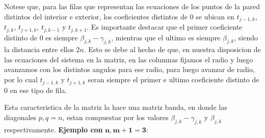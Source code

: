 \medskip
Notese que, para las filas que representan las ecuaciones de los puntos de la pared distintos del interior e exterior, los coeficientes distintos de 0 se ubican en $t_{j-1,k}$, $t_{j,k}$, $t_{j+1,k}$, $t_{j,k-1}$ y $t_{j,k+1}$.
Es importante destacar que el primer coeficiente distinto de 0 es siempre $\beta_{j,k} - \gamma_{j,k}$, mientras que el ultimo es siempre $\beta_{j,k}$, siendo la distancia entre ellos $2n$. Esto se debe al hecho de que, en nuestra disposicion de las ecuaciones del sistema en la matriz,
en las columnas fijamos el radio y luego avanzamos con los distintos angulos para ese radio, para luego avanzar de radio, por lo cual $t_{j-1,k}$ y $t_{j+1,k}$ seran siempre el primer e ultimo coeficiente distinto de 0 en ese tipo de fila.

Esta caracteristica de la matriz la hace una matriz banda, en donde las diagonales $p, q = n$, estan compuestas por los valores $\beta_{j,k} - \gamma_{j,k}$ y $\beta_{j,k}$ respectivamente.
\newline
\newline
\textbf{Ejemplo con} $\bm{n,m+1=3}$:
\begingroup
    \fontsize{7pt}{7pt}\selectfont
